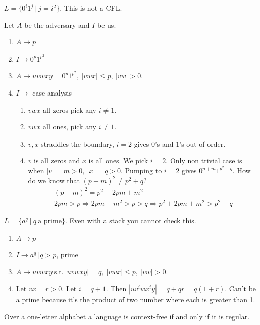 \documentclass[../598comp.tex]{subfiles}
\begin{document}
\begin{example}
  $L = \{0^i1^j \ | \ j = i^2\}$. This is not a CFL.

  Let $A$ be the adversary and $I$ be us.
  \begin{enumerate}
  \item 
    $A \to p$
  \item
    $I \to 0^p1^{p^2}$
  \item
    $A \to uvwxy = 0^p1^{p^2}, \ |vwx| \leq p, \ |vw| > 0$.
  \item
    $I \to $ case analysis
    \begin{enumerate}
    \item 
      $vwx$ all zeros pick any $i \neq 1$.
    \item
      $vwx$ all ones, pick any $i \neq 1$.
    \item
      $v, x$ straddles the boundary, $i = 2$ gives $0$'s and $1$'s out of order.
    \item
      $v$ is all zeros and $x$ is all ones. We pick $i = 2$. Only non trivial
      case is when $|v| = m > 0, \ |x| = q > 0$. Pumping to $i = 2$ gives $0^{p
        + m}1^{p^2 + q}$. How do we know that $(p + m)^2 \neq p^2 + q$?
      \begin{gather*}
        (p + m)^2 = p^2 + 2pm + m^2 \\
        2pm > p \Rightarrow 2pm + m^2 > p > q \Rightarrow p^2 + 2pm + m^2 > p^2
        + q
      \end{gather*}
    \end{enumerate}
  \end{enumerate}
\end{example}

\begin{example}
  $L = \{a^q \ | \ q \ \text{a prime} \}$. Even with a stack you cannot check this.
  \begin{enumerate}
  \item 
    $A \to p$
  \item
    $I \to a^q \ | q > p$, prime
  \item
    $A \to uvwxy \ \text{s.t.} \ |uvwxy| = q, \ |vwx| \leq p, \ |vw| > 0$.
  \item
    Let $vx = r > 0$. Let $i = q + 1$. Then $|uv^iwx^iy| = q + qr = q(1 + r)$.
    Can't be a prime because it's the product of two number where each is
    greater than 1.
  \end{enumerate}
\end{example}

\begin{theorem}
  Over a one-letter alphabet a language is context-free if and only if it is regular.
\end{theorem}
\end{document}
